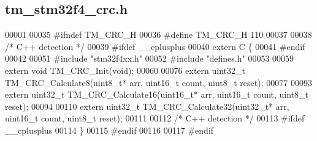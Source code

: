 \hypertarget{tm__stm32f4__crc_8h_source}{}\subsection{tm\+\_\+stm32f4\+\_\+crc.\+h}

\begin{DoxyCode}
00001 
00035 \textcolor{preprocessor}{#ifndef TM\_CRC\_H}
00036 \textcolor{preprocessor}{#define TM\_CRC\_H 110}
00037 
00038 \textcolor{comment}{/* C++ detection */}
00039 \textcolor{preprocessor}{#ifdef \_\_cplusplus}
00040 \textcolor{keyword}{extern} C \{
00041 \textcolor{preprocessor}{#endif}
00042 
00051 \textcolor{preprocessor}{#include "stm32f4xx.h"}
00052 \textcolor{preprocessor}{#include "defines.h"}
00053 
00059 \textcolor{keyword}{extern} \textcolor{keywordtype}{void} TM\_CRC\_Init(\textcolor{keywordtype}{void});
00060 
00076 \textcolor{keyword}{extern} uint32\_t TM\_CRC\_Calculate8(uint8\_t* arr, uint16\_t count, uint8\_t reset);
00077 
00093 \textcolor{keyword}{extern} uint32\_t TM\_CRC\_Calculate16(uint16\_t* arr, uint16\_t count, uint8\_t reset);
00094 
00110 \textcolor{keyword}{extern} uint32\_t TM\_CRC\_Calculate32(uint32\_t* arr, uint16\_t count, uint8\_t reset);
00111 
00112 \textcolor{comment}{/* C++ detection */}
00113 \textcolor{preprocessor}{#ifdef \_\_cplusplus}
00114 \}
00115 \textcolor{preprocessor}{#endif}
00116 
00117 \textcolor{preprocessor}{#endif}
\end{DoxyCode}
